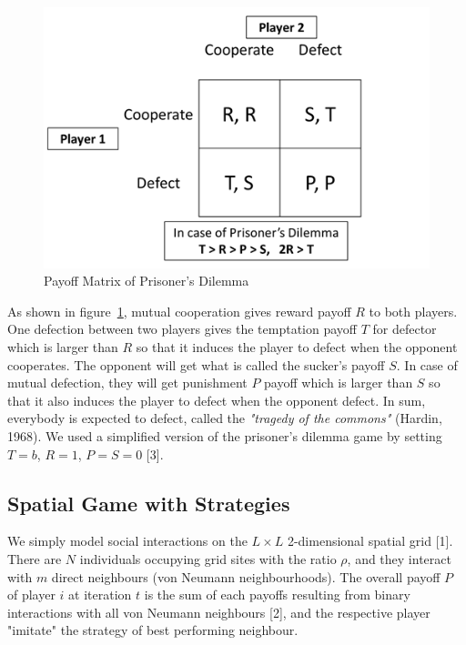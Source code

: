 \documentclass[11pt]{article}
\begin{document}
\begin{figure}[!htbp]
	\centering
	\includegraphics[scale=0.75]{../../other/pd_payoff_matrix.png}
    \caption{Payoff Matrix of Prisoner's Dilemma}
    \label{fig:paymatrix}
\end{figure}

\newpage
As shown in figure~\ref{fig:paymatrix}, mutual cooperation gives reward payoff $R$ to both players. One defection between two players gives the temptation payoff $T$ for defector which is larger than $R$ so that it induces the player to defect when the opponent cooperates. The opponent will get what is called the sucker's payoff $S$. In case of mutual defection, they will get punishment $P$ payoff which is larger than $S$ so that it also induces the player to defect when the opponent defect. In sum, everybody is expected to defect, called the \textit{"tragedy of the commons"} (Hardin, 1968). We used a simplified version of the prisoner's dilemma game by setting $T=b$, $R=1$, $P=S=0$ [3]. 


\subsection{Spatial Game with Strategies}

We simply model social interactions on the $L \times L$ 2-dimensional spatial grid [1]. There are $N$ individuals occupying grid sites with the ratio $\rho$, and they interact with $m$ direct neighbours (von Neumann neighbourhoods). The overall payoff $P$ of player $i$ at iteration $t$ is the sum of each payoffs resulting from binary interactions with all von Neumann neighbours [2], and the respective player "imitate" the strategy of best performing neighbour.
\end{document}
